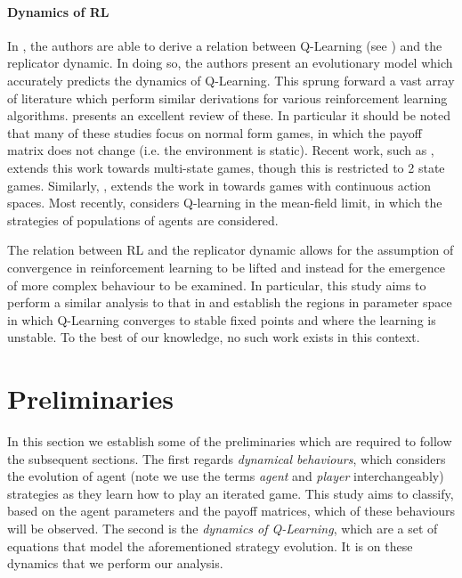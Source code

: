 \documentclass[sigconf,anonymous]{aamas}
\begin{document}
\paragraph{Dynamics of RL} In \cite{Tuyls2006AnGames}, the authors are able to derive a relation between Q-Learning (see \cite{Barber2012}) and the replicator dynamic. In doing so, the authors present an evolutionary model which accurately predicts the dynamics of Q-Learning. This sprung forward a vast array of literature which perform similar derivations for various reinforcement learning algorithms. \cite{Bloembergen2015} presents an excellent review of these. In particular it should be noted that many of these studies focus on normal form games, in which the payoff matrix does not change (i.e. the environment is static). Recent work, such as \cite{Hennes2008}, extends this work towards multi-state games, though this is restricted to 2 state games. Similarly, \cite{Galstyan2013}, extends the work in \cite{Tuyls2006AnGames} towards games with continuous action spaces. Most recently, \cite{Hu2019} considers Q-learning in the mean-field limit, in which the strategies of populations of agents are considered. 

The relation between RL and the replicator dynamic allows for the assumption of convergence in reinforcement learning to be lifted and instead for the emergence of more complex behaviour to be examined. In particular, this study aims to perform a similar analysis to that in \cite{Sanders2018} and establish the regions in parameter space in which Q-Learning converges to stable fixed points and where the learning is unstable. To the best of our knowledge, no such work exists in this context. 



\section{Preliminaries}

In this section we establish some of the preliminaries which
are required to follow the subsequent sections. The first regards
\textit{dynamical behaviours}, which considers the evolution of agent (note we use the terms \textit{agent} and \textit{player} interchangeably)
strategies as they learn how to play an iterated game. This study aims to
classify, based on the agent parameters and the payoff matrices, which
of these behaviours will be observed. The second is the \textit{dynamics
  of Q-Learning}, which are a set of equations that model the
aforementioned strategy evolution. It is on these dynamics that we
perform our analysis.
\end{document}
